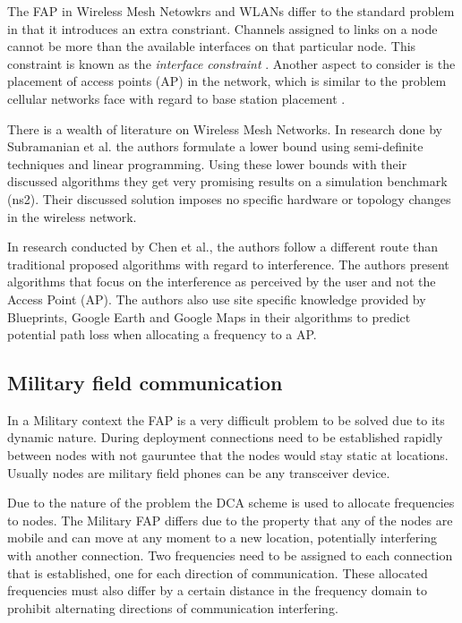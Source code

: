 The FAP in Wireless Mesh Netowkrs and WLANs differ to the standard problem in that it introduces an extra constriant. Channels assigned to links on a node cannot be more than the available interfaces on that particular node. This constraint is known as the \emph{interface constraint} \cite{MultiradioMeshNetworks}. Another aspect to consider is the placement of access points (AP) in the network, which is similar to the problem cellular networks face with regard to base station placement \cite{Karen2004}.

There is a wealth of literature on Wireless Mesh Networks. In research done by Subramanian et al.\cite{MultiradioMeshNetworks} the authors formulate a lower bound using semi-definite techniques and linear programming. Using these lower bounds with their discussed algorithms they get very promising results on a simulation benchmark (ns2). Their discussed solution imposes no specific hardware or topology changes in the wireless network.

In research conducted by Chen et al.\cite{SiteFAPWLAN}, the authors follow a different route than traditional proposed algorithms with regard to interference. The authors present algorithms that focus on the interference as perceived by the user and not the Access Point (AP). The authors also use site specific knowledge provided by Blueprints, Google Earth and Google Maps in their algorithms to predict potential path loss when allocating a frequency to a AP.
\subsection{Military field communication}
In a Military context the FAP is a very difficult problem to be solved due to its dynamic nature. During deployment connections need to be established rapidly between nodes with not gauruntee that the nodes would stay static at locations. Usually nodes are military field phones can be any transceiver device. 

Due to the nature of the problem the DCA scheme is used to allocate frequencies to nodes. The Military FAP differs due to the property that any of the nodes are mobile and can move at any moment to a new location, potentially interfering with another connection. Two frequencies need to be assigned to each connection that is established, one for each direction of communication. These allocated frequencies must also differ by a certain distance in the frequency domain to prohibit alternating directions of communication interfering.

